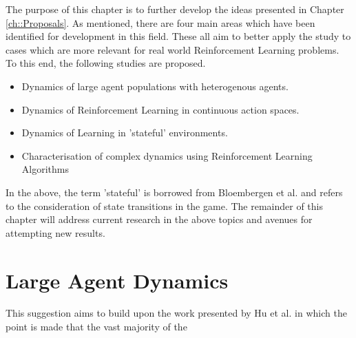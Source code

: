 \documentclass[../sample.tex]{subfiles}
\begin{document}
    The purpose of this chapter is to further develop the ideas presented in Chapter
    \ref{ch::Proposals}. As mentioned, there are four main areas which have been identified for
    development in this field. These all aim to better apply the study to cases which are more
    relevant for real world Reinforcement Learning problems. To this end, the following studies are
    proposed.
    
    \begin{itemize}
        \item Dynamics of large agent populations with heterogenous agents.
        \item Dynamics of Reinforcement Learning in continuous action spaces.
        \item Dynamics of Learning in 'stateful' environments.
        \item Characterisation of complex dynamics using Reinforcement Learning Algorithms
    \end{itemize}

    In the above, the term 'stateful' is borrowed from Bloembergen et al. \cite{Bloembergen2015} and
   refers to the consideration of state transitions in the game. The remainder of this chapter will
   address current research in the above topics and avenues for attempting new results.
   
   \section{Large Agent Dynamics}

    This suggestion aims to build upon the work presented by Hu et al. \cite{Hu2019} in which the
    point is made that the vast majority of the 
    
\end{document}
